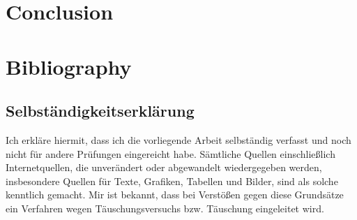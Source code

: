 \documentclass[
	a4paper,
	pagesize,
	pdftex,
	12pt,
	twoside, %
	BCOR=5mm, %
	ngerman,
	fleqn,
	final,
	]{scrartcl}
\begin{document}
\section{Conclusion}







\section{Bibliography}






\cleardoublepage%
{\parindent0cm
	\subsection*{Selbständigkeitserklärung}
	Ich erkläre hiermit, dass ich die vorliegende Arbeit selbständig verfasst
	und noch nicht für andere Prüfungen eingereicht habe.
	Sämtliche Quellen einschließlich Internetquellen, die unverändert oder
	abgewandelt wiedergegeben werden, insbesondere Quellen für Texte, Grafiken,
	Tabellen und Bilder, sind als solche kenntlich gemacht. Mir ist bekannt,
	dass bei Verstößen gegen diese Grundsätze ein Verfahren wegen
	Täuschungsversuchs bzw. Täuschung eingeleitet wird.
	\vspace{3\baselineskip}
	
}
\end{document}
